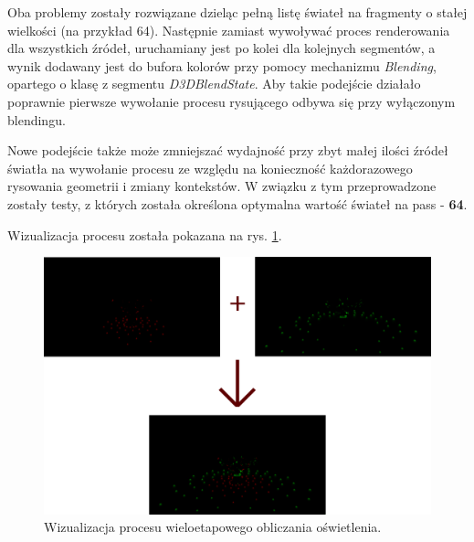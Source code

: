 	Oba problemy zostały rozwiązane dzieląc pełną listę świateł na fragmenty o stałej wielkości (na przykład 64). Następnie zamiast wywoływać proces renderowania dla wszystkich źródeł, uruchamiany jest po kolei dla kolejnych segmentów, a wynik dodawany jest do bufora kolorów przy pomocy mechanizmu \textit{Blending}, opartego o klasę z segmentu \textit{D3DBlendState}. Aby takie podejście działało poprawnie pierwsze wywołanie procesu rysującego odbywa się przy wyłączonym blendingu.
	
	Nowe podejście także może zmniejszać wydajność przy zbyt małej ilości źródeł światła na wywołanie procesu ze względu na konieczność każdorazowego rysowania geometrii i zmiany kontekstów. W związku z tym przeprowadzone zostały testy, z których została określona optymalna wartość świateł na pass - \textbf{64}.
	
	Wizualizacja procesu została pokazana na rys. \ref{Rendering_MultiPassLighting}.
	
		
	\begin{figure}[h!]
		\centering
		\includegraphics[width=\textwidth]{images/lightsTest_combined.png}
		\caption{Wizualizacja procesu wieloetapowego obliczania oświetlenia.}
		\label{Rendering_MultiPassLighting}
	\end{figure}